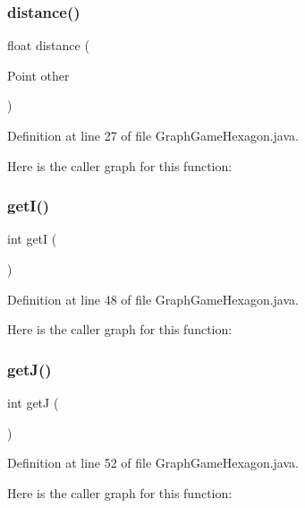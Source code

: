 \subsubsection{distance()}
{\footnotesize\ttfamily float distance (\begin{DoxyParamCaption}\item[{Point}]{other }\end{DoxyParamCaption})}



Definition at line 27 of file Graph\+Game\+Hexagon.\+java.

Here is the caller graph for this function\+:
\mbox{\label{classsf_1_1unitingtwist_1_1_graph_game_hexagon_a496b13cbdf0546a80c140ea3d147b5f8}} 
\subsubsection{get\+I()}
{\footnotesize\ttfamily int getI (\begin{DoxyParamCaption}{ }\end{DoxyParamCaption})}



Definition at line 48 of file Graph\+Game\+Hexagon.\+java.

Here is the caller graph for this function\+:
\mbox{\label{classsf_1_1unitingtwist_1_1_graph_game_hexagon_a02ef75a2737802ad48cafb98f5e9d7ca}} 
\subsubsection{get\+J()}
{\footnotesize\ttfamily int getJ (\begin{DoxyParamCaption}{ }\end{DoxyParamCaption})}



Definition at line 52 of file Graph\+Game\+Hexagon.\+java.

Here is the caller graph for this function\+:
\mbox{\label{classsf_1_1unitingtwist_1_1_graph_game_hexagon_ab83bca143bb78bf22c57d15fdeeb91b3}} 
